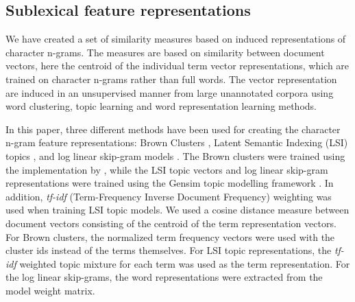 \subsection{Sublexical feature representations}
\label{subrep-features}

We have created a set of similarity measures based on induced representations of character n-grams. The measures are based on similarity between document vectors, here the centroid of the individual term vector representations, which are trained on character n-grams rather than full words. The vector representation are induced in an unsupervised manner from large unannotated corpora using word clustering, topic learning and word representation learning methods.

In this paper,  three different  methods have been used for creating the character n-gram feature representations: 
Brown Clusters \cite{brown1992class}, Latent Semantic Indexing (LSI) topics \cite{deerwester1990indexing}, 
and log linear skip-gram models \cite{mikolov2013efficient}.
The Brown clusters were trained using the implementation by , while the LSI topic vectors and log linear skip-gram representations were trained using the Gensim topic modelling framework \cite{gensim_lrec}. 
In addition, {\em tf-idf\/} (Term-Frequency Inverse Document Frequency) weighting was used when training LSI topic models. 
We used a cosine distance measure between document vectors consisting of the centroid of the term representation vectors. 
For Brown clusters, the normalized term frequency vectors were used with the cluster ids instead of the terms themselves. 
For LSI topic representations, the {\em tf-idf\/} weighted topic mixture for each term was used as the term representation. 
For the log linear skip-grams, the word representations were extracted from the model weight matrix.

